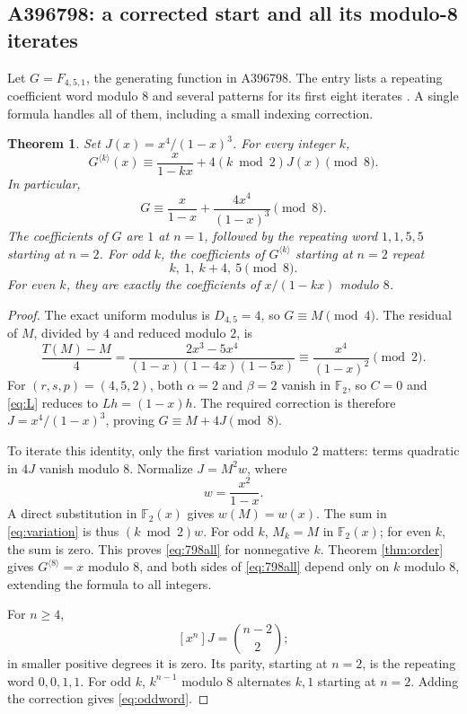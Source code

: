 \documentclass[11pt,letterpaper]{article}
\newtheorem{theorem}{Theorem}[section]
\theoremstyle{definition}
\theoremstyle{remark}
\newcommand{\F}{\mathbb F}
\newcommand{\iter}[2]{#1^{\langle #2\rangle}}
\newcommand{\coeff}[1]{[x^{#1}]}
\begin{document}
\subsection{A396798: a corrected start and all its modulo-8 iterates}
Let $G=F_{4,5,1}$, the generating function in A396798.  The entry lists
a repeating coefficient word modulo $8$ and several patterns for its
first eight iterates \cite{oeis798}.  A single formula handles all of
them, including a small indexing correction.

\begin{theorem}\label{thm:798}
Set $J(x)=x^4/(1-x)^3$.  For every integer $k$,
\begin{equation}\label{eq:798all}
 \iter{G}{k}(x)\equiv\frac{x}{1-kx}
       +4(k\bmod2)J(x)\pmod8.
\end{equation}
In particular,
\[
 G\equiv\frac{x}{1-x}+\frac{4x^4}{(1-x)^3}\pmod8.
\]
The coefficients of $G$ are $1$ at $n=1$, followed by the repeating
word $1,1,5,5$ starting at $n=2$.  For odd $k$, the coefficients of
$\iter{G}{k}$ starting at $n=2$ repeat
\begin{equation}\label{eq:oddword}
 k,\ 1,\ k+4,\ 5\pmod8.
\end{equation}
For even $k$, they are exactly the coefficients of $x/(1-kx)$ modulo $8$.
\end{theorem}
\begin{proof}
The exact uniform modulus is $D_{4,5}=4$, so $G\equiv M\pmod4$.
The residual of $M$, divided by $4$ and reduced modulo $2$, is
\[
 \frac{T(M)-M}{4}
 =\frac{2x^3-5x^4}{(1-x)(1-4x)(1-5x)}
 \equiv\frac{x^4}{(1-x)^2}\pmod2.
\]
For $(r,s,p)=(4,5,2)$, both $\alpha=2$ and $\beta=2$ vanish in $\F_2$,
so $C=0$ and \eqref{eq:L} reduces to $Lh=(1-x)h$.
The required correction is therefore $J=x^4/(1-x)^3$,
proving $G\equiv M+4J\pmod8$.

To iterate this identity, only the first variation modulo $2$ matters:
terms quadratic in $4J$ vanish modulo $8$.
Normalize $J=M^2w$, where
\[
 w=\frac{x^2}{1-x}.
\]
A direct substitution in $\F_2(x)$ gives $w(M)=w(x)$.
The sum in \eqref{eq:variation} is thus $(k\bmod2)w$.
For odd $k$, $M_k=M$ in $\F_2(x)$; for even $k$, the sum is zero.
This proves \eqref{eq:798all} for nonnegative $k$.
Theorem \ref{thm:order} gives $\iter{G}{8}=x$ modulo $8$, and both sides
of \eqref{eq:798all} depend only on $k$ modulo $8$, extending the formula
to all integers.

For $n\geq4$,
\[
 \coeff{n}J=\binom{n-2}{2};
\]
in smaller positive degrees it is zero.  Its parity, starting at
$n=2$, is the repeating word $0,0,1,1$.
For odd $k$, $k^{n-1}$ modulo $8$ alternates $k,1$ starting at $n=2$.
Adding the correction gives \eqref{eq:oddword}.
\end{proof}
\end{document}
